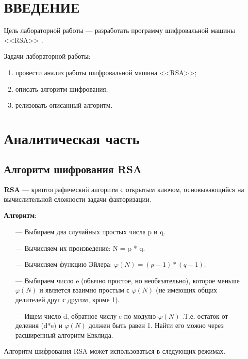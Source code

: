 \section*{\large{ВВЕДЕНИЕ}}

Цель лабораторной работы --- разработать программу шифровальной машины <<RSA>> \cite{Enigma}.

Задачи лабораторной работы:

\begin{enumerate}
    \item провести анализ работы шифровальной машина <<RSA>>;
    \item описать алгоритм шифрования;
    \item релизовать описанный алгоритм.
\end{enumerate}

\clearpage
\section{Аналитическая часть}

\subsection{Алгоритм шифрования RSA}

\textbf{RSA} \cite{Enigma} ---  криптографический алгоритм с открытым ключом, основывающийся на вычислительной сложности задачи факторизации.

\textbf{Алгоритм}:

\begin{itemize}
	\item[---] Выбираем два случайных простых числа p и q.
	\item[---] Вычисляем их произведение: N = p * q.
	\item[---] Вычисляем функцию Эйлера: $\varphi(N) = (p-1) * (q-1)$.
	\item[---] Выбираем число e (обычно простое, но необязательно), которое меньше $\varphi(N)$ и является взаимно простым с $\varphi(N)$ (не имеющих общих делителей друг с другом, кроме 1).
	\item[---] Ищем число d, обратное числу e по модулю $\varphi(N)$ .Т.е. остаток от деления (d*e) и $\varphi(N)$ должен быть равен 1. Найти его можно через расширенный алгоритм Евклида.

\end{itemize}

Алгоритм шифрования RSA может использоваться в следующих режимах.


